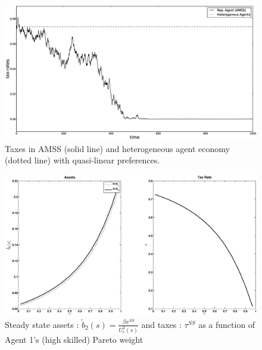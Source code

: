 \documentclass[thmsb,11pt]{article}
\begin{document}
\newpage

  \begin{figure}[htp]
 \centering
 \includegraphics[width=\textwidth]{Draft25Graphs/BEGS_AMSS.eps}
 \caption{Taxes in AMSS (solid line) and heterogeneous agent economy (dotted line) with quasi-linear preferences.}
 \label{fig: AMSS vs BEGS}
 \end{figure}

\newpage

  \begin{figure}[htp]
 \centering
 \includegraphics[width=\textwidth]{Draft25Graphs/SS_alpha1.eps}
 \caption{ Steady state assets : $\tilde{b}_2(s)=\frac{\beta  x^{SS}}{U^2_c(s)}$ and taxes : $\tau^{SS}$ as a function of Agent 1's (high skilled) Pareto weight}
 \label{fig: SS comparative}
 \end{figure}

\newpage
\end{document}
